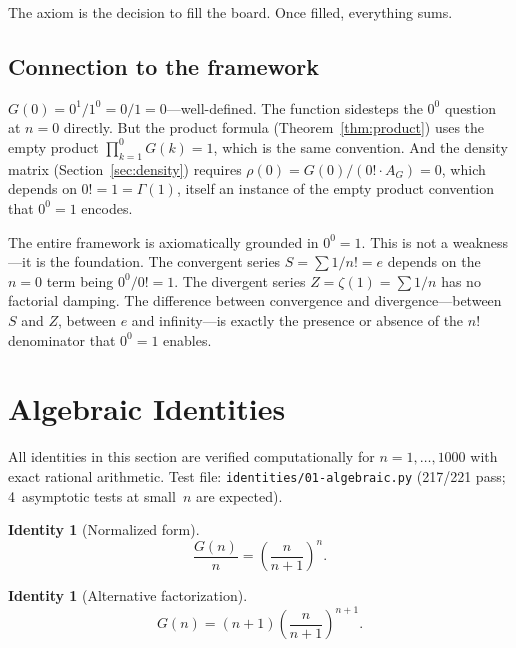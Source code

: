 \documentclass[11pt,a4paper]{article}
\theoremstyle{definition}
\newtheorem{identity}[theorem]{Identity}
\theoremstyle{remark}
\newcommand{\AG}{A_G}
\begin{document}
\medskip
The axiom is the decision to fill the board. Once filled, everything sums.

\subsection{Connection to the framework}

$G(0) = 0^{1}/1^{0} = 0/1 = 0$---well-defined. The function sidesteps the $0^{0}$ question at $n=0$ directly. But the product formula (Theorem~\ref{thm:product}) uses the empty product $\prod_{k=1}^{0}G(k)=1$, which is the same convention. And the density matrix (Section~\ref{sec:density}) requires $\rho(0)=G(0)/(0!\cdot\AG)=0$, which depends on $0!=1=\Gamma(1)$, itself an instance of the empty product convention that $0^{0}=1$ encodes.

The entire framework is axiomatically grounded in $0^{0}=1$. This is not a weakness---it is the foundation. The convergent series $S=\sum 1/n! = e$ depends on the $n=0$ term being $0^{0}/0!=1$. The divergent series $Z=\zeta(1)=\sum 1/n$ has no factorial damping. The difference between convergence and divergence---between $S$ and $Z$, between $e$ and infinity---is exactly the presence or absence of the $n!$ denominator that $0^{0}=1$ enables.

\section{Algebraic Identities}\label{sec:algebraic}

All identities in this section are verified computationally for $n=1,\ldots,1000$ with exact rational arithmetic. Test file: \texttt{identities/01-algebraic.py} (217/221 pass; 4~asymptotic tests at small~$n$ are expected).

\begin{identity}[Normalized form]\label{id:norm}
\begin{equation}\label{eq:norm}
  \frac{G(n)}{n} = \left(\frac{n}{n+1}\right)^{n}.
\end{equation}
\end{identity}

\begin{identity}[Alternative factorization]\label{id:altfact}
\begin{equation}\label{eq:altfact}
  G(n) = (n+1)\left(\frac{n}{n+1}\right)^{n+1}.
\end{equation}
\end{identity}
\end{document}
